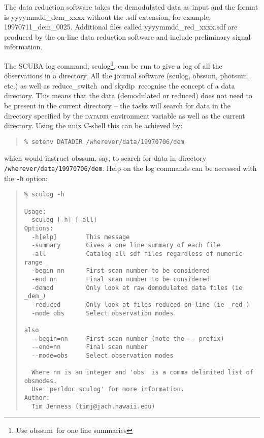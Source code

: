 \documentclass[twoside,11pt,fleqn]{article}
\newenvironment{myquote}{\begin{quote}\begin{small}}{\end{small}\end{quote}}
\newcommand{\task}[1]{{\sf #1}}
\newcommand{\resw}{\xref{\task{reduce\_switch}}{sun216}{REDUCE_SWITCH}}
\newcommand{\skydip}{\xref{\task{skydip}}{sun216}{SKYDIP}}
\newcommand{\sculog}{\xref{\task{sculog}}{sun216}{SCULOG}}
\newcommand{\photsum}{\xref{\task{photsum}}{sun216}{PHOTSUM}}
\newcommand{\obssum}{\xref{\task{obssum}}{sun216}{OBSSUM}}
\newcommand{\xref}[3]{#1}
\begin{document}
The data reduction software takes the demodulated data as input and
the format is yyyymmdd\_dem\_xxxx without the \mbox{.sdf} extension,
for example, 19970711\_dem\_0025.  Additional files called
yyyymmdd\_red\_xxxx\mbox{.sdf} are produced by the on-line data reduction
software and include preliminary signal information.

The SCUBA log command, \sculog\footnote{Use \obssum\ for one line summaries},
can be run to give a log of all the observations in a directory.
All the journal software (\sculog, \obssum, \photsum, etc.)
as well as \resw\ and \skydip\ recognise the concept of a data
directory. This means that the data (demodulated or reduced) does not need
to be present in the current directory -- the tasks will search for data in the
directory specified by the \textsc{datadir} environment variable as well as
the current directory. Using the unix C-shell this can be achieved by:
\begin{myquote}
\begin{verbatim}
% setenv DATADIR /wherever/data/19970706/dem
\end{verbatim}
\end{myquote}
which would instruct \obssum, say, to search for data in directory
\texttt{/wherever/data/19970706\-/dem}.
Help on the log commands
can be accessed with the {\tt -h} option:

\begin{myquote}
\begin{verbatim}
% sculog -h
 
Usage: 
  sculog [-h] [-all]
Options:
  -h[elp]        This message
  -summary       Gives a one line summary of each file
  -all           Catalog all sdf files regardless of numeric range
  -begin nn      First scan number to be considered
  -end nn        Final scan number to be considered
  -demod         Only look at raw demodulated data files (ie _dem_)
  -reduced       Only look at files reduced on-line (ie _red_)
  -mode obs      Select observation modes
 
also
  --begin=nn     First scan number (note the -- prefix)
  --end=nn       Final scan number
  --mode=obs     Select observation modes
 
  Where nn is an integer and 'obs' is a comma delimited list of obsmodes.
  Use 'perldoc sculog' for more information.
Author:
  Tim Jenness (timj@jach.hawaii.edu)
\end{verbatim}
\end{myquote}
\end{document}
